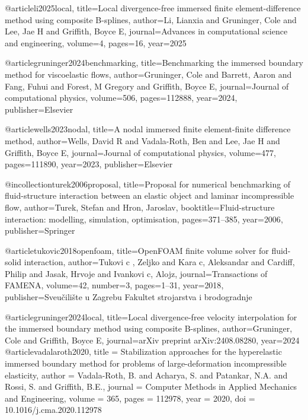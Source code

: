 @article{li2025local,
  title={Local divergence-free immersed finite element-difference method using composite B-splines},
  author={Li, Lianxia and Gruninger, Cole and Lee, Jae H and Griffith, Boyce E},
  journal={Advances in computational science and engineering},
  volume={4},
  pages={16},
  year={2025}
}

@article{gruninger2024benchmarking,
  title={Benchmarking the immersed boundary method for viscoelastic flows},
  author={Gruninger, Cole and Barrett, Aaron and Fang, Fuhui and Forest, M Gregory and Griffith, Boyce E},
  journal={Journal of computational physics},
  volume={506},
  pages={112888},
  year={2024},
  publisher={Elsevier}
}

@article{wells2023nodal,
  title={A nodal immersed finite element-finite difference method},
  author={Wells, David R and Vadala-Roth, Ben and Lee, Jae H and Griffith, Boyce E},
  journal={Journal of computational physics},
  volume={477},
  pages={111890},
  year={2023},
  publisher={Elsevier}
}

@incollection{turek2006proposal,
  title={Proposal for numerical benchmarking of fluid-structure interaction between an elastic object and laminar incompressible flow},
  author={Turek, Stefan and Hron, Jaroslav},
  booktitle={Fluid-structure interaction: modelling, simulation, optimisation},
  pages={371--385},
  year={2006},
  publisher={Springer}
}

@article{tukovic2018openfoam,
  title={OpenFOAM finite volume solver for fluid-solid interaction},
  author={Tukovi c , Zeljko and Kara c, Aleksandar and Cardiff, Philip and Jasak, Hrvoje and Ivankovi c, Alojz},
  journal={Transactions of FAMENA},
  volume={42},
  number={3},
  pages={1--31},
  year={2018},
  publisher={Sveu{\v{c}}ili{\v{s}}te u Zagrebu Fakultet strojarstva i brodogradnje}
}

@article{gruninger2024local,
  title={Local divergence-free velocity interpolation for the immersed boundary method using composite B-splines},
  author={Gruninger, Cole and Griffith, Boyce E},
  journal={arXiv preprint arXiv:2408.08280},
  year={2024}
}
@article{vadalaroth2020,
  title = {Stabilization approaches for the hyperelastic immersed boundary method for problems of large-deformation incompressible elasticity},
  author = {Vadala-Roth, B. and Acharya, S. and Patankar, N.A. and Rossi, S. and Griffith, B.E.},
  journal = {Computer Methods in Applied Mechanics and Engineering},
  volume = {365},
  pages = {112978},
  year = {2020},
  doi = {10.1016/j.cma.2020.112978}
}

